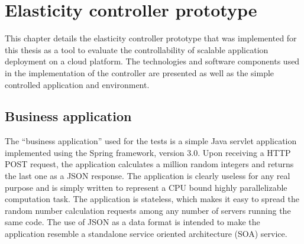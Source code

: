 \documentclass[english]{tktltiki2}
\theoremstyle{definition}
\theoremstyle{remark}
\begin{document}









%
%
%
%
%

\section{Elasticity controller prototype}
\label{sec:elasticitycontroller}

This chapter details the elasticity controller prototype that was implemented for this thesis as a tool to evaluate the controllability of scalable application deployment on a cloud platform. The technologies and software components used in the implementation of the controller are presented as well as the simple controlled application and environment.

\subsection{Business application}

The ``business application'' used for the tests is a simple Java servlet application implemented using the Spring framework, version 3.0. Upon receiving a HTTP POST request, the application calculates a million random integers and returns the last one as a JSON response. The application is clearly useless for any real purpose and is simply written to represent a CPU bound highly parallelizable computation task. The application is stateless, which makes it easy to spread the random number calculation requests among any number of servers running the same code. The use of JSON as a data format is intended to make the application resemble a standalone service oriented architecture (SOA) service.
\end{document}
